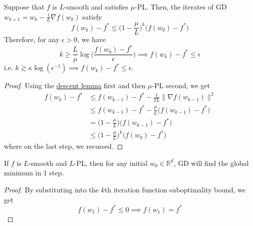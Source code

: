 	\begin{theorem}
		\label{thm:linear_convergence_pl}
		Suppose that $f$ is $L$-smooth and satisfies $\mu$-PL. Then, the iterates of GD $w_{k+1} = w_k - \frac{1}{L} \nabla f(w_k)$ satisfy 
		\begin{equation}
			f(w_k) - f^\ast \leq \bigg( 1 - \frac{\mu}{L} \bigg)^k \big( f(w_0) - f^\ast \big) 
		\end{equation}
		Therefore, for any $\epsilon > 0$, we have 
		\begin{equation}
			k \geq \frac{L}{\mu} \log \bigg( \frac{f(w_0) - f^\ast}{\epsilon} \bigg) \implies f(w_k) - f^\ast \leq \epsilon
		\end{equation}
		i.e. $k \gtrsim \kappa \log(\epsilon^{-1}) \implies f(w_k) - f^\ast \leq \epsilon$. 
	\end{theorem}
	\begin{proof}
	  Using the \hyperref[thm:descent-lemma]{descent lemma} first and then $\mu$-PL second, we get 
		\begin{align}
			f(w_k) - f^\ast & \leq f(w_{k-1}) - f^\ast - \frac{1}{2L} \|\nabla f(w_{k-1})\|^2 \\ 
												 & \leq f(w_{k-1}) - f^\ast - \frac{\mu}{L} \big( f(w_{k-1}) - f^\ast \big) \\ 
												 & = \big(1 - \frac{\mu}{L} \big) \big( f(w_{k-1}) - f^\ast \big) \\ 
												 & \leq \Big(1 - \frac{\mu}{L} \Big)^k \big( f(w_{0}) - f^\ast \big) 
		\end{align}
		where on the last step, we recursed. 
	\end{proof}

	\begin{corollary}
		If $f$ is $L$-smooth and $L$-PL, then for any initial $w_0 \in \mathbb{R}^d$, GD will find the global minimum in 1 step. 
	\end{corollary}
	\begin{proof}
		By substituting into the $k$th iteration function suboptimality bound, we get 
		\begin{equation}
		  f(w_1) - f^\ast \leq 0 \implies f(w_1) = f^\ast
		\end{equation}
	\end{proof}

